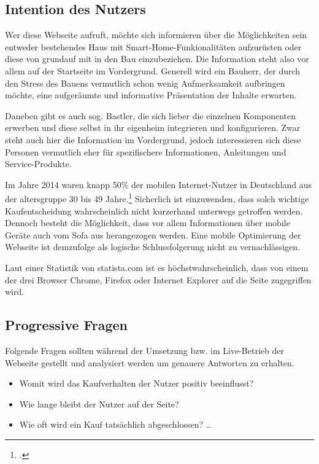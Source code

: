 \subsection{Intention des Nutzers}
Wer diese Webseite aufruft, möchte sich informieren über die Möglichkeiten sein entweder bestehendes Haus mit Smart-Home-Funkionalitäten aufzurüsten oder diese von grundauf mit in den Bau einzubeziehen. Die Information steht also vor allem auf der Startseite im Vordergrund. Generell wird ein Bauherr, der durch den Stress des Bauens vermutlich schon wenig Aufmerksamkeit aufbringen möchte, eine aufgeräumte und informative Präsentation der Inhalte erwarten.

Daneben gibt es auch sog. Bastler, die sich lieber die einzelnen Komponenten erwerben und diese selbst in ihr eigenheim integrieren und konfigurieren. Zwar steht auch hier die Information im Vordergrund, jedoch interessieren sich diese Personen vermutlich eher für spezifischere Informationen, Anleitungen und Service-Produkte.

Im Jahre 2014 waren knapp 50\% der mobilen Internet-Nutzer in Deutschland aus der altersgruppe 30 bis 49 Jahre.\footcite[vgl.][]{statista:alter} Sicherlich ist einzuwenden, dass solch wichtige Kaufentscheidung wahrscheinlich nicht kurzerhand unterwegs getroffen werden. Dennoch besteht die Möglichkeit, dass vor allem Informationen über mobile Geräte auch vom Sofa aus herangezogen werden. Eine mobile Optimierung der Webseite ist demzufolge als logische Schlussfolgerung nicht zu vernachlässigen. 

Laut einer Statistik von statista.com ist es höchstwahrscheinlich, dass von einem der drei Browser Chrome, Firefox oder Internet Explorer auf die Seite zugegriffen wird. 

\subsection{Progressive Fragen}
Folgende Fragen sollten während der Umsetzung bzw. im Live-Betrieb der Webseite gestellt und analysiert werden um genauere Antworten zu erhalten.
\begin{itemize}
	\item Womit wird das Kaufverhalten der Nutzer positiv beeinflusst? 
	\item Wie lange bleibt der Nutzer auf der Seite? 
	\item Wie oft wird ein Kauf tatsächlich abgeschlossen? \ldots
\end{itemize}
